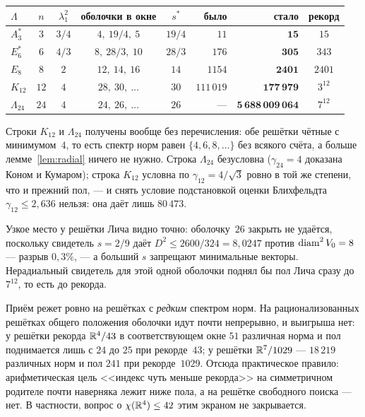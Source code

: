 \begin{center}\small
\begin{tabular}{lccccrrc}
\toprule
$\Lambda$ & $n$ & $\lambda_1^2$ & оболочки в окне & $s^{\ast}$ &
было & стало & рекорд\\
\midrule
$A_3^{*}$ & $3$ & $3/4$ & $4,\ 19/4,\ 5$ & $19/4$ & $11$ & $\mathbf{15}$ & $15$\\
$E_6^{*}$ & $6$ & $4/3$ & $8,\ 28/3,\ 10$ & $28/3$ & $176$ & $\mathbf{305}$ & $343$\\
$E_8$ & $8$ & $2$ & $12,\ 14,\ 16$ & $14$ & $1154$ & $\mathbf{2401}$ & $2401$\\
$K_{12}$ & $12$ & $4$ & $28,\ 30,\ \ldots$ & $30$ & $111\,019$ & $\mathbf{177\,979}$ & $3^{12}$\\
$\Lambda_{24}$ & $24$ & $4$ & $24,\ 26,\ \ldots$ & $26$ & --- & $\mathbf{5\,688\,009\,064}$ & $7^{12}$\\
\bottomrule
\end{tabular}
\end{center}

\noindent
Строки $K_{12}$ и $\Lambda_{24}$ получены вообще без перечисления: обе решётки
чётные с минимумом~$4$, то есть спектр норм равен $\{4,6,8,\dots\}$ без всякого
счёта, а больше лемме~\ref{lem:radial} ничего не нужно. Строка $\Lambda_{24}$
безусловна ($\gamma_{24}=4$ доказана Коном и Кумаром); строка $K_{12}$ условна
по $\gamma_{12}=4/\sqrt3$ ровно в той же степени, что и прежний пол, --- и
снять условие подстановкой оценки Блихфельдта $\gamma_{12}\le2{,}636$ нельзя:
она даёт лишь $80\,473$.

Узкое место у решётки Лича видно точно: оболочку~$26$ закрыть не удаётся,
поскольку свидетель $s=2/9$ даёт $D^2\le2600/324=8{,}0247$ против
$\operatorname{diam}^2V_0=8$ --- разрыв $0{,}3\%$, --- а больший $s$ запрещают минимальные
векторы. Нерадиальный свидетель для этой одной оболочки поднял бы пол Лича
сразу до $7^{12}$, то есть до рекорда.

\begin{remark}\label{rem:shellsilent}
Приём режет ровно на решётках с \emph{редким} спектром норм. На
рационализованных решётках общего положения оболочки идут почти непрерывно, и
выигрыша нет: у решётки рекорда $\mathbb{R}^4/43$ в соответствующем окне
$51$ различная норма и пол поднимается лишь с $24$ до $25$ при рекорде~$43$;
у решётки $\mathbb{R}^7/1029$ --- $18\,219$ различных норм и пол $241$ при
рекорде~$1029$. Отсюда практическое правило: арифметическая цель <<индекс чуть
меньше рекорда>> на симметричном родителе почти наверняка лежит ниже пола, а на
решётке свободного поиска --- нет. В частности, вопрос о $\chi(\mathbb{R}^4)\le42$
этим экраном не закрывается.
\end{remark}


